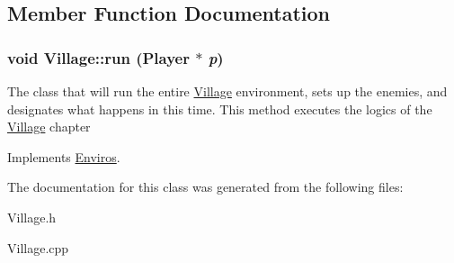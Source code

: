 \subsection{Member Function Documentation}
\hypertarget{classVillage_ae03bedd05525bcfd997c1cfe1216025c}{
\subsubsection[{run}]{\setlength{\rightskip}{0pt plus 5cm}void Village::run ({\bf Player} $\ast$ {\em p})}}
\label{classVillage_ae03bedd05525bcfd997c1cfe1216025c}


The class that will run the entire \hyperlink{classVillage}{Village} environment, sets up the enemies, and designates what happens in this time. This method executes the logics of the \hyperlink{classVillage}{Village} chapter 

Implements \hyperlink{classEnviros}{Enviros}.

The documentation for this class was generated from the following files:\begin{DoxyCompactItemize}
\item 
Village.h\item 
Village.cpp\end{DoxyCompactItemize}
